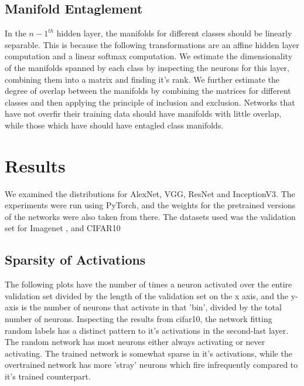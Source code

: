 \documentclass{article}
\begin{document}
        \subsection{Manifold Entaglement}
            In the $n-1^{th}$ hidden layer, the manifolds for different classes should be linearly separable. This is because the following transformations are an affine hidden layer computation and a linear softmax computation. We estimate the dimensionality of the manifolds spanned by each class by inspecting the neurons for this layer, combining them into a matrix and finding it's rank. We further estimate the degree of overlap between the manifolds by combining the matrices for different classes and then applying the principle of inclusion and exclusion. Networks that have not overfir their training data should have manifolds with little overlap, while those which have should have entagled class manifolds. 

    \section{Results}
        We examined the distributions for AlexNet, VGG, ResNet and InceptionV3. The experiments were run using PyTorch, and the weights for the pretrained versions of the networks were also taken from there. The datasets used was the validation set for Imagenet \cite{russakovsky2015imagenetlargescalevisual}, and CIFAR10 \cite{Krizhevsky2009LearningML}
        \subsection{Sparsity of Activations}
            The following plots have the number of times a neuron activated over the entire validation set divided by the length of the validation set on the x axis, and the y-axis is the number of neurons that activate in that 'bin', divided by the total number of neurons.
            Inspecting the results from cifar10, the network fitting random labels has a distinct pattern to it's activations in the second-last layer. The random network has most neurons either always activating or never activating. The trained network is somewhat sparse in it's activations, while the overtrained network has more 'stray' neurons which fire infrequently compared to it's trained counterpart. 
        
\end{document}

